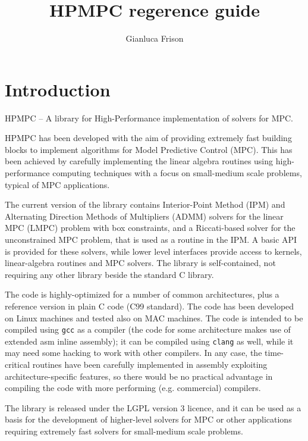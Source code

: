 \documentclass[a4paper]{report}
\title{HPMPC regerence guide}
\author{Gianluca Frison}
\begin{document}
\maketitle
\tableofcontents

\chapter{Introduction}

HPMPC -- A library for High-Performance implementation of solvers for MPC.

HPMPC has been developed with the aim of providing extremely fast building blocks to implement algorithms for Model Predictive Control (MPC). 
This has been achieved by carefully implementing the linear algebra routines using high-performance computing techniques with a focus on small-medium scale problems, typical of MPC applications.

The current version of the library contains Interior-Point Method (IPM) and Alternating Direction Methods of Multipliers (ADMM) solvers for the linear MPC (LMPC) problem with box constraints, and a Riccati-based solver for the unconstrained MPC problem, that is used as a routine in the IPM.
A basic API is provided for these solvers, while lower level interfaces provide access to kernels, linear-algebra routines and MPC solvers.
The library is self-contained, not requiring any other library beside the standard C library.

The code is highly-optimized for a number of common architectures, plus a reference version in plain C code (C99 standard).
The code has been developed on Linux machines and tested also on MAC machines. 
The code is intended to be compiled using {\tt gcc} as a compiler (the code for some architecture makes use of extended asm inline assembly); it can be compiled using {\tt clang} as well, while it may need some hacking to work with other compilers.
In any case, the time-critical routines have been carefully implemented in assembly exploiting architecture-specific features, so there would be no practical advantage in compiling the code with more performing (e.g. commercial) compilers.

The library is released under the LGPL version 3 licence, and it can be used as a basis for the development of higher-level solvers for MPC or other applications requiring extremely fast solvers for small-medium scale problems.
\end{document}
